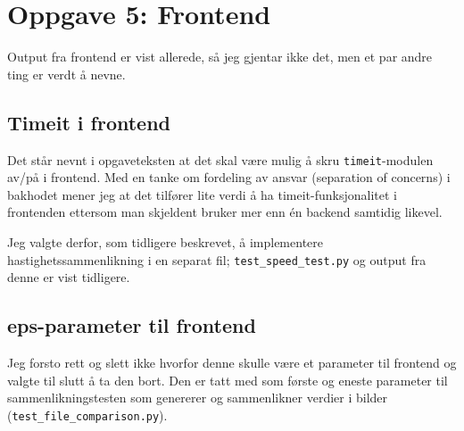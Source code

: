\section*{Oppgave 5: Frontend}

Output fra frontend er vist allerede, så jeg gjentar ikke det, men et par andre ting er verdt å nevne.

\subsection*{Timeit i frontend}
Det står nevnt i opgaveteksten at det skal være mulig å skru \verb;timeit;-modulen av/på i frontend. Med en tanke om fordeling av ansvar (separation of concerns) i bakhodet mener jeg at det tilfører lite verdi å ha timeit-funksjonalitet i frontenden ettersom man skjeldent bruker mer enn én backend samtidig likevel.

Jeg valgte derfor, som tidligere beskrevet, å implementere hastighetssammenlikning i en separat fil; \verb;test_speed_test.py; og output fra denne er vist tidligere.

\subsection*{eps-parameter til frontend}
Jeg forsto rett og slett ikke hvorfor denne skulle være et parameter til frontend og valgte til slutt å ta den bort. Den er tatt med som første og eneste parameter til sammenlikningstesten som genererer og sammenlikner verdier i bilder (\verb;test_file_comparison.py;).